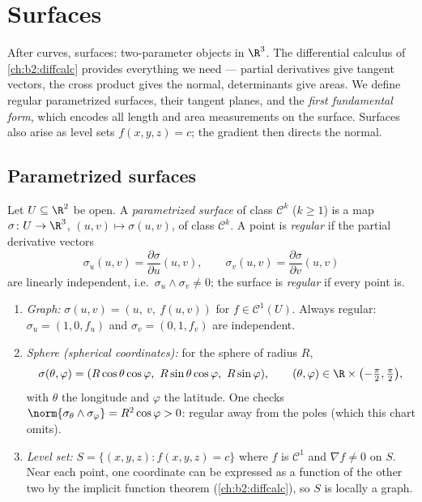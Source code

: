 \chapter{Surfaces}\label{ch:b2:surfaces}

After curves, surfaces: two-parameter objects in $\R^3$. The
differential calculus of \cref{ch:b2:diffcalc} provides everything
we need --- partial derivatives give tangent vectors, the cross
product gives the normal, determinants give areas. We define
regular parametrized surfaces, their tangent planes, and the
\emph{first fundamental form}, which encodes all length and area
measurements on the surface. Surfaces also arise as level sets
$f(x, y, z) = c$; the gradient then directs the normal.

\section{Parametrized surfaces}

\begin{definition}\label{def:b2:surfaces:param}
Let $U \subseteq \R^2$ be open. A \emph{parametrized surface} of
class $\mathcal{C}^k$ ($k \geq 1$) is a map $\sigma \colon U \to
\R^3$, $(u, v) \mapsto \sigma(u, v)$, of class $\mathcal{C}^k$. A
point is \emph{regular} if the partial derivative vectors
\[
\sigma_u(u, v) = \frac{\partial\sigma}{\partial u}(u,v),
\qquad
\sigma_v(u, v) = \frac{\partial\sigma}{\partial v}(u,v)
\]
are linearly independent, i.e.\ $\sigma_u \wedge \sigma_v \neq 0$;
the surface is \emph{regular} if every point is.
\end{definition}

\begin{example}\label{ex:b2:surfaces:standard}
\leavevmode
\begin{enumerate}
\item \emph{Graph:} $\sigma(u, v) = (u,\ v,\ f(u, v))$ for $f \in
\mathcal{C}^1(U)$. Always regular: $\sigma_u = (1, 0, f_u)$ and
$\sigma_v = (0, 1, f_v)$ are independent.
\item \emph{Sphere (spherical coordinates):} for the sphere of
radius $R$,
\[
\sigma(\theta, \varphi)
= (R\cos\theta\cos\varphi,\ R\sin\theta\cos\varphi,\
R\sin\varphi),
\qquad
(\theta, \varphi) \in \R \times
\bigl(-\tfrac\pi2, \tfrac\pi2\bigr),
\]
with $\theta$ the longitude and $\varphi$ the latitude. One checks
$\norm{\sigma_\theta \wedge \sigma_\varphi} = R^2\cos\varphi > 0$:
regular away from the poles (which this chart omits).
\item \emph{Level set:} $S = \{(x,y,z) : f(x, y, z) = c\}$ where
$f$ is $\mathcal{C}^1$ and $\nabla f \neq 0$ on $S$. Near each
point, one coordinate can be expressed as a function of the other
two by the implicit function theorem (\cref{ch:b2:diffcalc}), so
$S$ is locally a graph.
\end{enumerate}
\end{example}

